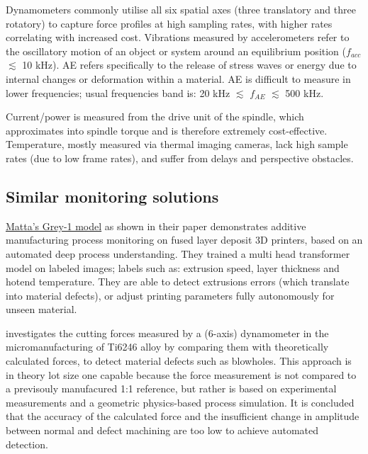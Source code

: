 \documentclass[5p,times,procedia]{elsarticle}
\begin{document}
\vspace*{-.5\baselineskip}
Dynamometers commonly utilise all six spatial axes (three translatory and three rotatory) to capture force profiles at high sampling rates, with higher rates correlating with increased cost.
Vibrations measured by accelerometers refer to the oscillatory motion of an object or system around an equilibrium position ($f_{acc}$ $\lesssim$ 10 kHz).
AE refers specifically to the release of stress waves or energy due to internal changes or deformation within a material. AE is difficult to measure in lower frequencies; usual frequencies band is: 20 kHz $\lesssim$ $f_{AE}$ $\lesssim$ 500 kHz. \cite{Jozwik.Mika2015, Sun.Hu.ea2020}

Current/power is measured from the drive unit of the spindle, which approximates into spindle torque and is therefore extremely cost-effective.
Temperature, mostly measured via thermal imaging cameras, lack high sample rates (due to low frame rates), and suffer from delays and perspective obstacles. 



\subsection{Similar monitoring solutions}
\vspace*{-\baselineskip}


\href{https://www.matta.ai/greymatta}{Matta's Grey-1 model} as shown in their paper \cite{Brion.Pattinson2022} demonstrates additive manufacturing process monitoring on fused layer deposit 3D printers, based on an automated deep process understanding. 
They trained a multi head transformer model on labeled images; labels such as: extrusion speed, layer thickness and hotend temperature. They are able to detect extrusions errors (which translate into material defects), or adjust printing parameters fully autonomously for unseen material. \cite{Brion.Pattinson2022}


\cite{Pfirrmann.Baumann.ea2021} investigates the cutting forces measured by a (6-axis) dynamometer in the micromanufacturing of Ti6246 alloy by comparing them with theoretically calculated forces, to detect material defects such as blowholes.
This approach is in theory lot size one capable because the force measurement is not compared to a previsouly manufacured 1:1 reference, but rather is based on experimental measurements and a geometric physics-based process simulation. 
It is concluded that the accuracy of the calculated force and the insufficient change in amplitude between normal and defect machining are too low to achieve automated detection. \cite[p.169]{Pfirrmann.Baumann.ea2021} 
\end{document}
